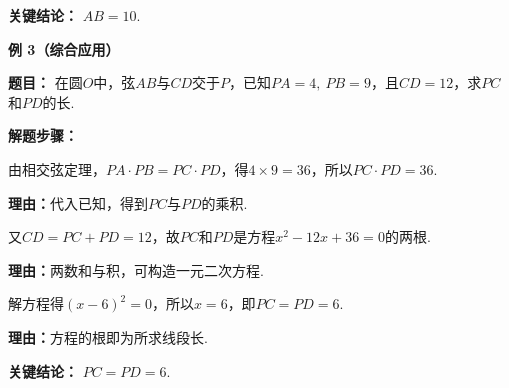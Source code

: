 \begin{examplebox}
	\textbf{\textcolor{CExample}{关键结论：}} \textbf{$AB=10$}.

	\medskip
	\textbf{\textcolor{CExample}{例 3（综合应用）}}

	\textbf{\textcolor{CExample}{题目：}} 在圆$O$中，弦$AB$与$CD$交于$P$，已知$PA=4,\ PB=9$，且$CD=12$，求$PC$和$PD$的长.

	\textbf{\textcolor{CExample}{解题步骤：}}

	\begin{description}[style=nextline, leftmargin=2.8em, labelsep=0.5em, itemsep=0.45em]
		\item[\textbf{第一步（求乘积）：}]
		      由相交弦定理，$PA\cdot PB = PC\cdot PD$，得$4\times9=36$，所以$PC\cdot PD=36$.
		      \par\textbf{理由：}代入已知，得到$PC$与$PD$的乘积.

		\item[\textbf{第二步（列方程组）：}]
		      又$CD=PC+PD=12$，故$PC$和$PD$是方程$x^2-12x+36=0$的两根.
		      \par\textbf{理由：}两数和与积，可构造一元二次方程.

		\item[\textbf{第三步（解方程）：}]
		      解方程得$(x-6)^2=0$，所以$x=6$，即$PC=PD=6$.
		      \par\textbf{理由：}方程的根即为所求线段长.
	\end{description}

	\textbf{\textcolor{CExample}{关键结论：}} \textbf{$PC=PD=6$}.
\end{examplebox}